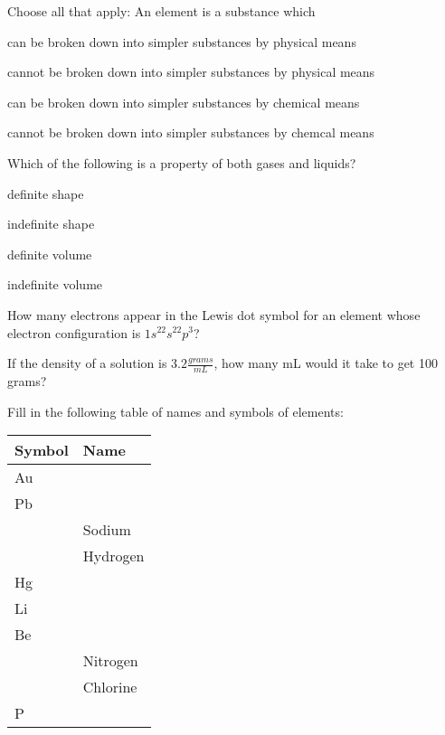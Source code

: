 \documentclass[addpoints, 12pt]{exam}
\begin{document}
\begin{questions}
\question[4] Choose all that apply:  An element is a substance which
\begin{choices}
  \choice can be broken down into simpler substances by physical means

  \choice cannot be broken down into simpler substances by physical means

  \choice   can be broken down into simpler substances by chemical means

  \choice  cannot be broken down into simpler substances by chemcal means
  
\end{choices}

\question[4] Which of the following is a property of both gases and
liquids?
\begin{choices}
  \choice definite shape
 
 \choice indefinite shape

 \choice definite volume

 \choice indefinite volume
\end{choices}

\question[4] How many electrons appear in the Lewis dot symbol for an
element whose electron configuration is $1s^22s^22p^3$?

\begin{choices}




\end{choices}


\question[5]
If the density of a solution is $3.2 \frac{grams}{mL}$, how many mL would it take to get 100 grams?

\question[10]
Fill in the following table of names and symbols of elements:

\begin{tabular}{| l | l |}
\hline
Symbol & Name \\
\hline
Au & \\
Pb & \\
 & Sodium\\
 & Hydrogen\\
Hg & \\
Li & \\
Be & \\
 & Nitrogen \\
 & Chlorine \\
P & \\
\hline
\end{tabular}


\end{questions}
\end{document}
